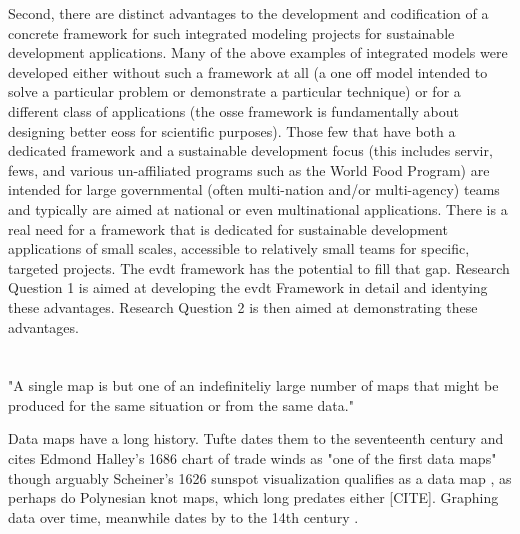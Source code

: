 Second, there are distinct advantages to the development and codification of a concrete framework for such integrated modeling projects for sustainable development applications. Many of the above examples of integrated models were developed either without such a framework at all (a one off model intended to solve a particular problem or demonstrate a particular technique) or for a different class of applications (the \ac{osse} framework is fundamentally about designing better \acp{eos} for scientific purposes). Those few that have both a dedicated framework and a sustainable development focus (this includes \ac{servir}, \ac{fews}, and various \ac{un}-affiliated programs such as the World Food Program) are intended for large governmental (often multi-nation and/or multi-agency) teams and typically are aimed at national or even multinational applications. There is a real need for a framework that is dedicated for sustainable development applications of small scales, accessible to relatively small teams for specific, targeted projects. The \ac{evdt} framework has the potential to fill that gap. Research Question 1 is aimed at developing the \ac{evdt} Framework in detail and identying these advantages. Research Question 2 is then aimed at demonstrating these advantages.


\section{}


\section{}


"A single map is but one of an indefiniteliy large number of maps that might be produced for the same situation or from the same data." \cite{monmonierHowLieMaps1996}

Data maps have a long history. Tufte dates them to the seventeenth century and cites Edmond Halley's 1686 chart of trade winds as "one of the first data maps" \cite{tufteVisualDisplayQuantitative2001} though arguably Scheiner's 1626 sunspot visualization qualifies as a data map \cite{friendlyBriefHistoryData2008}, as perhaps do Polynesian knot maps, which long predates either [CITE]. Graphing data over time, meanwhile dates by to the 14th century \cite{friendlyBriefHistoryData2008}.

